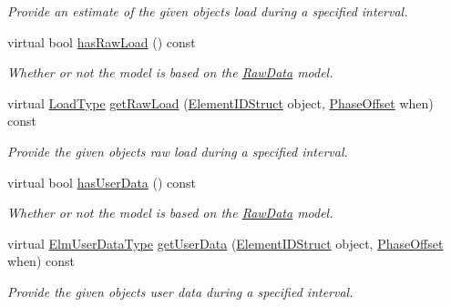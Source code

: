 \begin{DoxyCompactItemize}
\begin{DoxyCompactList}\small\item\em Provide an estimate of the given object\textquotesingle{}s load during a specified interval. \end{DoxyCompactList}\item 
virtual bool \hyperlink{structvt_1_1vrt_1_1collection_1_1balance_1_1_load_model_a626f65c651ea15f4a40b9f058778c620}{has\+Raw\+Load} () const
\begin{DoxyCompactList}\small\item\em Whether or not the model is based on the \hyperlink{structvt_1_1vrt_1_1collection_1_1balance_1_1_raw_data}{Raw\+Data} model. \end{DoxyCompactList}\item 
virtual \hyperlink{namespacevt_a8fb51741340b87d7aaee0bef60e9896b}{Load\+Type} \hyperlink{structvt_1_1vrt_1_1collection_1_1balance_1_1_load_model_a314fc5cf3a426c564b05bddaa44c3a35}{get\+Raw\+Load} (\hyperlink{namespacevt_1_1vrt_1_1collection_1_1balance_a9f5b53fafb270212279a4757d2c4cd28}{Element\+I\+D\+Struct} object, \hyperlink{structvt_1_1vrt_1_1collection_1_1balance_1_1_phase_offset}{Phase\+Offset} when) const
\begin{DoxyCompactList}\small\item\em Provide the given object\textquotesingle{}s raw load during a specified interval. \end{DoxyCompactList}\item 
virtual bool \hyperlink{structvt_1_1vrt_1_1collection_1_1balance_1_1_load_model_a100e482fde649bb7e4e1e2b62419e200}{has\+User\+Data} () const
\begin{DoxyCompactList}\small\item\em Whether or not the model is based on the \hyperlink{structvt_1_1vrt_1_1collection_1_1balance_1_1_raw_data}{Raw\+Data} model. \end{DoxyCompactList}\item 
virtual \hyperlink{namespacevt_1_1vrt_1_1collection_1_1balance_abf9eea0f4c24e41036ab844025e7d4c8}{Elm\+User\+Data\+Type} \hyperlink{structvt_1_1vrt_1_1collection_1_1balance_1_1_load_model_a27d01248fe1e6cb621bfb04261b5662f}{get\+User\+Data} (\hyperlink{namespacevt_1_1vrt_1_1collection_1_1balance_a9f5b53fafb270212279a4757d2c4cd28}{Element\+I\+D\+Struct} object, \hyperlink{structvt_1_1vrt_1_1collection_1_1balance_1_1_phase_offset}{Phase\+Offset} when) const
\begin{DoxyCompactList}\small\item\em Provide the given object\textquotesingle{}s user data during a specified interval. \end{DoxyCompactList}\item 

\end{DoxyCompactItemize}
